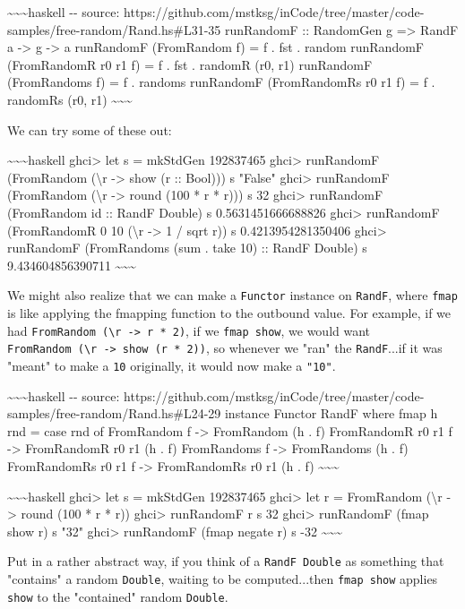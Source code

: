 \documentclass[]{article}
\begin{document}
\textasciitilde{}\textasciitilde{}\textasciitilde{}haskell -\/- source:
https://github.com/mstksg/inCode/tree/master/code-samples/free-random/Rand.hs\#L31-35
runRandomF :: RandomGen g =\textgreater{} RandF a -\textgreater{} g
-\textgreater{} a runRandomF (FromRandom f) = f . fst . random runRandomF
(FromRandomR r0 r1 f) = f . fst . randomR (r0, r1) runRandomF (FromRandoms f) =
f . randoms runRandomF (FromRandomRs r0 r1 f) = f . randomRs (r0, r1)
\textasciitilde{}\textasciitilde{}\textasciitilde{}

We can try some of these out:

\textasciitilde{}\textasciitilde{}\textasciitilde{}haskell ghci\textgreater{}
let s = mkStdGen 192837465 ghci\textgreater{} runRandomF (FromRandom
(\textbackslash{}r -\textgreater{} show (r :: Bool))) s "False"
ghci\textgreater{} runRandomF (FromRandom (\textbackslash{}r -\textgreater{}
round (100 * r * r))) s 32 ghci\textgreater{} runRandomF (FromRandom id :: RandF
Double) s 0.5631451666688826 ghci\textgreater{} runRandomF (FromRandomR 0 10
(\textbackslash{}r -\textgreater{} 1 / sqrt r)) s 0.4213954281350406
ghci\textgreater{} runRandomF (FromRandoms (sum . take 10) :: RandF Double) s
9.434604856390711 \textasciitilde{}\textasciitilde{}\textasciitilde{}

We might also realize that we can make a \texttt{Functor} instance on
\texttt{RandF}, where \texttt{fmap} is like applying the fmapping function to
the outbound value. For example, if we had
\texttt{FromRandom\ (\textbackslash{}r\ -\textgreater{}\ r\ *\ 2)}, if we
\texttt{fmap\ show}, we would want
\texttt{FromRandom\ (\textbackslash{}r\ -\textgreater{}\ show\ (r\ *\ 2))}, so
whenever we "ran" the \texttt{RandF}...if it was "meant" to make a \texttt{10}
originally, it would now make a \texttt{"10"}.

\textasciitilde{}\textasciitilde{}\textasciitilde{}haskell -\/- source:
https://github.com/mstksg/inCode/tree/master/code-samples/free-random/Rand.hs\#L24-29
instance Functor RandF where fmap h rnd = case rnd of FromRandom f
-\textgreater{} FromRandom (h . f) FromRandomR r0 r1 f -\textgreater{}
FromRandomR r0 r1 (h . f) FromRandoms f -\textgreater{} FromRandoms (h . f)
FromRandomRs r0 r1 f -\textgreater{} FromRandomRs r0 r1 (h . f)
\textasciitilde{}\textasciitilde{}\textasciitilde{}

\textasciitilde{}\textasciitilde{}\textasciitilde{}haskell ghci\textgreater{}
let s = mkStdGen 192837465 ghci\textgreater{} let r = FromRandom
(\textbackslash{}r -\textgreater{} round (100 * r * r)) ghci\textgreater{}
runRandomF r s 32 ghci\textgreater{} runRandomF (fmap show r) s "32"
ghci\textgreater{} runRandomF (fmap negate r) s -32
\textasciitilde{}\textasciitilde{}\textasciitilde{}

Put in a rather abstract way, if you think of a \texttt{RandF\ Double} as
something that "contains" a random \texttt{Double}, waiting to be
computed...then \texttt{fmap\ show} applies \texttt{show} to the "contained"
random \texttt{Double}.
\end{document}
